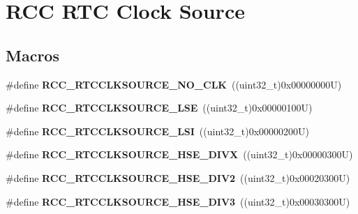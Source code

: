 \hypertarget{group___r_c_c___r_t_c___clock___source}{}\section{R\+CC R\+TC Clock Source}
\label{group___r_c_c___r_t_c___clock___source}
\subsection*{Macros}
\begin{DoxyCompactItemize}
\item 
\mbox{\label{group___r_c_c___r_t_c___clock___source_gacce0b2f54d103340d8c3a218e86e295d}} 
\#define {\bfseries R\+C\+C\+\_\+\+R\+T\+C\+C\+L\+K\+S\+O\+U\+R\+C\+E\+\_\+\+N\+O\+\_\+\+C\+LK}~((uint32\+\_\+t)0x00000000\+U)
\item 
\mbox{\label{group___r_c_c___r_t_c___clock___source_ga5dca8d63f250a20bd6bc005670d0c150}} 
\#define {\bfseries R\+C\+C\+\_\+\+R\+T\+C\+C\+L\+K\+S\+O\+U\+R\+C\+E\+\_\+\+L\+SE}~((uint32\+\_\+t)0x00000100\+U)
\item 
\mbox{\label{group___r_c_c___r_t_c___clock___source_gab47a1afb8b5eef9f20f4772961d0a5f4}} 
\#define {\bfseries R\+C\+C\+\_\+\+R\+T\+C\+C\+L\+K\+S\+O\+U\+R\+C\+E\+\_\+\+L\+SI}~((uint32\+\_\+t)0x00000200\+U)
\item 
\mbox{\label{group___r_c_c___r_t_c___clock___source_ga2e3715826835647795863c32f9aebad7}} 
\#define {\bfseries R\+C\+C\+\_\+\+R\+T\+C\+C\+L\+K\+S\+O\+U\+R\+C\+E\+\_\+\+H\+S\+E\+\_\+\+D\+I\+VX}~((uint32\+\_\+t)0x00000300\+U)
\item 
\mbox{\label{group___r_c_c___r_t_c___clock___source_gac1ee63256acb5637e994abf629edaf3b}} 
\#define {\bfseries R\+C\+C\+\_\+\+R\+T\+C\+C\+L\+K\+S\+O\+U\+R\+C\+E\+\_\+\+H\+S\+E\+\_\+\+D\+I\+V2}~((uint32\+\_\+t)0x00020300\+U)
\item 
\mbox{\label{group___r_c_c___r_t_c___clock___source_ga242119dd2fc5e6ec6d7c2aa239dbcb9f}} 
\#define {\bfseries R\+C\+C\+\_\+\+R\+T\+C\+C\+L\+K\+S\+O\+U\+R\+C\+E\+\_\+\+H\+S\+E\+\_\+\+D\+I\+V3}~((uint32\+\_\+t)0x00030300\+U)

\end{DoxyCompactItemize}
